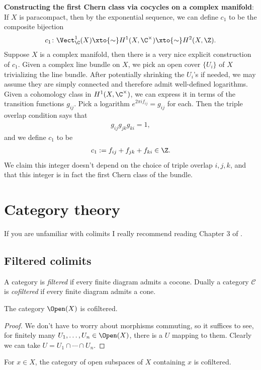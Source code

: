 \documentclass[11pt]{amsart}
\begin{document}
\textbf{Constructing the first Chern class via cocycles on a complex manifold}: If $X$ is paracompact, then by the exponential sequence, we can define $c_1$ to be the composite bijection
\begin{align*}
    c_1 \colon \Vect_\C^1(X) \xto{\sim} H^1(X,\C^\times) \xto{\sim} H^2(X,\Z).
\end{align*}
Suppose $X$ is a complex manifold, then there is a very nice explicit construction of $c_1$. Given a complex line bundle on $X$, we pick an open cover $\{U_i\}$ of $X$ trivializing the line bundle. After potentially shrinking the $U_i$'s if needed, we may assume they are simply connected and therefore admit well-defined logarithms. Given a cohomology class in $H^1(X,\C^\times)$, we can express it in terms of the transition functions $g_{ij}$. Pick a logarithm $e^{2\pi i f_{ij}} = g_{ij}$ for each. Then the triple overlap condition says that
\begin{align*}
    g_{ij} g_{jk} g_{ki} = 1,
\end{align*}
and we define $c_1$ to be
\begin{align*}
    c_1 := f_{ij} + f_{jk} + f_{ki} \in \Z.
\end{align*}
We claim this integer doesn't depend on the choice of triple overlap $i,j,k$, and that this integer is in fact the first Chern class of the bundle.









\newpage
\appendix

\section{Category theory}
If you are unfamiliar with colimits I really recommend reading Chapter 3 of \cite{riehlCategoryTheoryContext2016}.

\subsection{Filtered colimits}

\begin{definition} A category is \emph{filtered} if every finite diagram admits a cocone. Dually a category $\mathscr{C}$ is \emph{cofiltered} if every finite diagram admits a cone.
\end{definition}

\begin{example}\label{exa:OpenX-filtered} The category $\Open(X)$ is cofiltered.
\end{example}
\begin{proof} We don't have to worry about morphisms commuting, so it suffices to see, for finitely many $U_1, \ldots, U_n\in \Open(X)$, there is a $U$ mapping to them. Clearly we can take $U = U_1\cap \cdots \cap U_n$.
\end{proof}
\begin{example}\label{exa:OpenX-containing-x-filtered} For $x\in X$, the category of open subspaces of $X$ containing $x$ is cofiltered.
\end{example}
\end{document}
